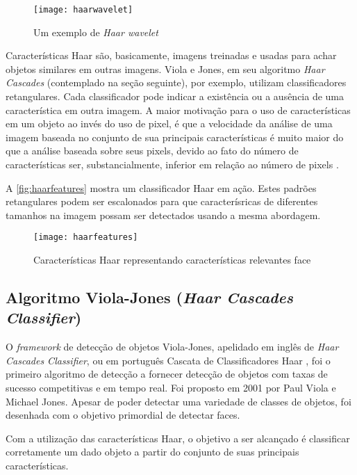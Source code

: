  \begin{figure}[h]
 	\centering
 	\texttt{[image: haarwavelet]}
 	\caption{Um exemplo de \textit{Haar wavelet}}
 	\label{fig:haarwavelet}
 \end{figure}

Características Haar são, basicamente, imagens treinadas e usadas para achar objetos similares em outras imagens. Viola e Jones, em seu algoritmo \textit{Haar Cascades} (contemplado na seção seguinte), por exemplo, utilizam classificadores retangulares. Cada classificador pode indicar a existência ou a ausência de uma característica em outra imagem. A maior motivação para o uso de características em um objeto ao invés do uso de pixel, é que a velocidade da análise de uma imagem baseada no conjunto de sua principais características é muito maior do que a análise baseada sobre seus pixels, devido ao fato do número de características ser, substancialmente, inferior em relação ao número de pixels \cite{gustavo_cascata}.

A \autoref{fig:haarfeatures} mostra um classificador Haar em ação. Estes padrões retangulares podem ser escalonados para que caracterísricas de diferentes tamanhos na imagem possam ser detectados usando a mesma abordagem.

 \begin{figure}[h]
	\centering
	\texttt{[image: haarfeatures]}
	\caption{Características Haar representando características relevantes face}
	\label{fig:haarfeatures}
\end{figure}




\subsection{Algoritmo Viola-Jones (\textit{Haar Cascades Classifier}) }\label{subsubsec:violajones}

O \textit{framework} de detecção de objetos Viola-Jones, apelidado em inglês de \textit{Haar Cascades Classifier}, ou em português Cascata de Classificadores Haar \cite{gustavo_cascata}, foi o primeiro algoritmo de detecção a fornecer detecção de objetos com taxas de sucesso competitivas e em tempo real. Foi proposto em 2001 por Paul Viola e Michael Jones. Apesar de poder detectar uma variedade de classes de objetos, foi desenhada com o objetivo primordial de detectar faces.

Com a utilização das características Haar, o objetivo a ser alcançado é classificar corretamente um dado objeto a partir do conjunto de suas principais características. 

